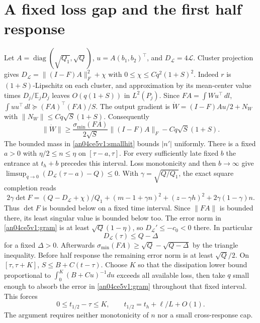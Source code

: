 \documentclass[11pt]{article}
\newcommand{\dd}{\,dl}
\newcommand{\Ll}{\mathcal L}
\newcommand{\E}{\mathbb E}
\begin{document}
\section{A fixed loss gap and the first half response}\label{an04ce5v1:half}
Let $A=\operatorname{diag}(\sqrt{Q_1},\sqrt Q)$, $u=A(b_1,b_2)^\top$, and $D_{\Ll}=4\Ll$.
Cluster projection gives $D_{\Ll}=\|(I-F)A\|_F^2+\chi$ with $0\le\chi\le Cq^2(1+S)^2$. Indeed $r$ is $(1+S)$-Lipschitz on each cluster, and approximation by its mean-center value times $D_j/\E_jD_j$ leaves $O(q(1+S))$ in $L^2(P_j)$. Since $FA=\int Wu^\top\dd$, $\int uu^\top\dd\succeq (FA)^\top(FA)/S$. The output gradient is $\dot W=(I-F)Au/2+N_W$ with $\|N_W\|\le Cq\sqrt S(1+S)$. Consequently
\begin{equation}\label{an04ce5v1:gram}
 \|\dot W\|\ge\frac{\sigma_{\min}(FA)}{2\sqrt S}\|(I-F)A\|_F-Cq\sqrt S(1+S).
\end{equation}
The bounded mass in \eqref{an04ce5v1:smallhit} bounds $|n'|$ uniformly. There is a fixed $a>0$ with $\eta/2\le n\le\eta$ on $[\tau-a,\tau]$. For every sufficiently late fixed $b$ the entrance at $t_h+b$ precedes this interval. Loss monotonicity and then $b\to\infty$ give $\limsup_{q\to0}(D_{\Ll}(\tau-a)-Q)\le0$. With $\gamma=\sqrt{Q/Q_1}$, the exact square completion reads
\[
 2\gamma\det F=(Q-D_{\Ll}+\chi)/Q_1+
 (m-1+\gamma n)^2+(z-\gamma h)^2+2\gamma(1-\gamma)n .
\]
Thus $\det F$ is bounded below on a fixed time interval. Since $\|FA\|$ is bounded there, its least singular value is bounded below too. The error norm in \eqref{an04ce5v1:gram} is at least $\sqrt Q(1-\eta)$, so $D_{\Ll}'\le-c_0<0$ there. In particular
\begin{equation}\label{an04ce5v1:gap}
 D_{\Ll}(\tau)\le Q-\Delta
\end{equation}
for a fixed $\Delta>0$. Afterwards $\sigma_{\min}(FA)\ge\sqrt Q-\sqrt{Q-\Delta}$ by the triangle inequality. Before half response the remaining error norm is at least $\sqrt Q/2$. On $[\tau,\tau+K]$, $S\le B+C(t-\tau)$. Choose $K$ so that the dissipation lower bound proportional to $\int_0^K (B+Cu)^{-1}du$ exceeds all available loss, then take $q$ small enough to absorb the error in \eqref{an04ce5v1:gram} throughout that fixed interval. This forces
\begin{equation}\label{an04ce5v1:halfclock}
 0\le t_{1/2}-\tau\le K,\qquad t_{1/2}=t_h+\ell/L+O(1).
\end{equation}
The argument requires neither monotonicity of $n$ nor a small cross-response cap.
\end{document}
